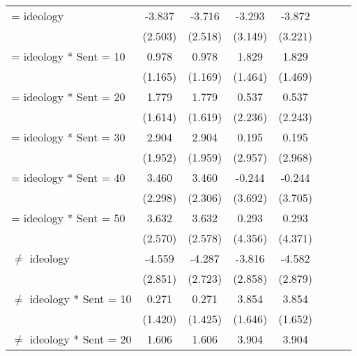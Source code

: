 \begin{table}[H]
{\begin{threeparttable}
\begin{tabular}{lccccccc}
\addlinespace
= ideology          &      -3.837         &      -3.716         &      -3.293         &      -3.872         \\
                    &     (2.503)         &     (2.518)         &     (3.149)         &     (3.221)         \\
\addlinespace
= ideology * Sent = 10&       0.978         &       0.978         &       1.829         &       1.829         \\
                    &     (1.165)         &     (1.169)         &     (1.464)         &     (1.469)         \\
\addlinespace
= ideology * Sent = 20&       1.779         &       1.779         &       0.537         &       0.537         \\
                    &     (1.614)         &     (1.619)         &     (2.236)         &     (2.243)         \\
\addlinespace
= ideology * Sent = 30&       2.904         &       2.904         &       0.195         &       0.195         \\
                    &     (1.952)         &     (1.959)         &     (2.957)         &     (2.968)         \\
\addlinespace
= ideology * Sent = 40&       3.460         &       3.460         &      -0.244         &      -0.244         \\
                    &     (2.298)         &     (2.306)         &     (3.692)         &     (3.705)         \\
\addlinespace
= ideology * Sent = 50&       3.632         &       3.632         &       0.293         &       0.293         \\
                    &     (2.570)         &     (2.578)         &     (4.356)         &     (4.371)         \\
\addlinespace
$\neq$ ideology     &      -4.559         &      -4.287         &      -3.816         &      -4.582         \\
                    &     (2.851)         &     (2.723)         &     (2.858)         &     (2.879)         \\
\addlinespace
$\neq$ ideology * Sent = 10&       0.271         &       0.271         &       3.854\sym{**} &       3.854\sym{**} \\
                    &     (1.420)         &     (1.425)         &     (1.646)         &     (1.652)         \\
\addlinespace
$\neq$ ideology * Sent = 20&       1.606         &       1.606         &       3.904         &       3.904         \\

\end{tabular}
\end{threeparttable}}
\end{table}
